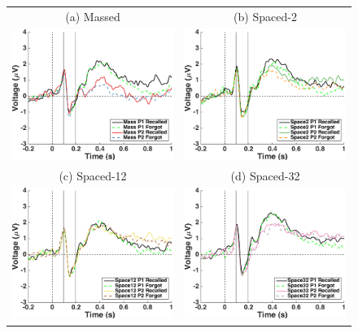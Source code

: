 \begin{figure}[hp]
  \centering
  \begin{tabular}{cc}
  \multicolumn{1}{c}{(a) Massed} & \multicolumn{1}{c}{(b) Spaced-2} \\
  \includegraphics[width=.35\textwidth]{./figs/exp2/tla_single_ga_word_rc_mass_p1_word_fo_mass_p1_word_rc_mass_p2_word_fo_mass_p2_E50_E51_E57_E58_E59_E64_E65_-200_1000_legend_xylabel} &
  \includegraphics[width=.35\textwidth]{./figs/exp2/tla_single_ga_word_rc_spac2_p1_word_fo_spac2_p1_word_rc_spac2_p2_word_fo_spac2_p2_E50_E51_E57_E58_E59_E64_E65_-200_1000_legend_xylabel} \\
  \multicolumn{1}{c}{(c) Spaced-12} & \multicolumn{1}{c}{(d) Spaced-32} \\
  \includegraphics[width=.35\textwidth]{./figs/exp2/tla_single_ga_word_rc_spac12_p1_word_fo_spac12_p1_word_rc_spac12_p2_word_fo_spac12_p2_E50_E51_E57_E58_E59_E64_E65_-200_1000_legend_xylabel} &
  \includegraphics[width=.35\textwidth]{./figs/exp2/tla_single_ga_word_rc_spac32_p1_word_fo_spac32_p1_word_rc_spac32_p2_word_fo_spac32_p2_E50_E51_E57_E58_E59_E64_E65_-200_1000_legend_xylabel} \\

\end{tabular}
\end{figure}
